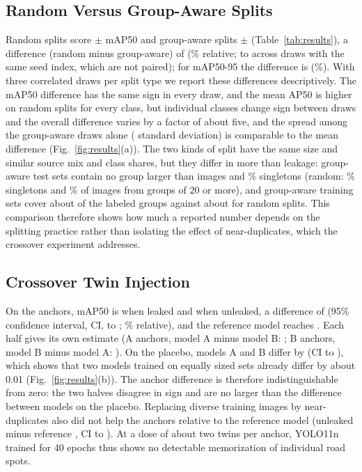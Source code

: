 \documentclass[conference,a4paper]{IEEEtran}
\begin{document}
\subsection{Random Versus Group-Aware Splits}
\label{sec:e1}
Random splits score \RandomFifty{} $\pm$ \RandomFiftySd{} mAP50 and group-aware splits \GroupFifty{} $\pm$ \GroupFiftySd{} (Table~\ref{tab:results}), a difference (random minus group-aware) of \InflFifty{} (\InflFiftyRel\% relative; \InflFiftyMin{} to \InflFiftyMax{} across draws with the same seed index, which are not paired); for mAP50-95 the difference is \InflFiftyNF{} (\InflFiftyNFRel\%). With three correlated draws per split type we report these differences descriptively. The mAP50 difference has the same sign in every draw, and the mean AP50 is higher on random splits for every class, but individual classes change sign between draws and the overall difference varies by a factor of about five, and the spread among the group-aware draws alone (\GroupFiftySd{} standard deviation) is comparable to the mean difference (Fig.~\ref{fig:results}(a)). The two kinds of split have the same size and similar source mix and class shares, but they differ in more than leakage: group-aware test sets contain no group larger than \GroupTestMaxGroup{} images and \GroupTestSingleton\% singletons (random: \RandTestSingleton\% singletons and \RandTestBigGroups\% of images from groups of 20 or more), and group-aware training sets cover about \GroupTrainGroups{} of the \LabeledGroups{} labeled groups against about \RandTrainGroups{} for random splits. This comparison therefore shows how much a reported number depends on the splitting practice rather than isolating the effect of near-duplicates, which the crossover experiment addresses.

\subsection{Crossover Twin Injection}
On the anchors, mAP50 is \InjLeaked{} when leaked and \InjUnleaked{} when unleaked, a difference of \InjDiff{} (95\% confidence interval, CI, \InjDiffLo{} to \InjDiffHi{}; \InjDiffRel\% relative), and the reference model reaches \InjBase{}. Each half gives its own estimate (A anchors, model A minus model B: \HalfA; B anchors, model B minus model A: \HalfB). On the placebo, models A and B differ by \PlacDiff{} (CI \PlacDiffLo{} to \PlacDiffHi{}), which shows that two models trained on equally sized sets already differ by about 0.01 (Fig.~\ref{fig:results}(b)). The anchor difference is therefore indistinguishable from zero: the two halves disagree in sign and are no larger than the difference between models on the placebo. Replacing \InjTwins{} diverse training images by near-duplicates also did not help the anchors relative to the reference model (unleaked minus reference \InjUB{}, CI \InjUBLo{} to \InjUBHi{}). At a dose of about two twins per anchor, YOLO11n trained for 40 epochs thus shows no detectable memorization of individual road spots.
\end{document}
